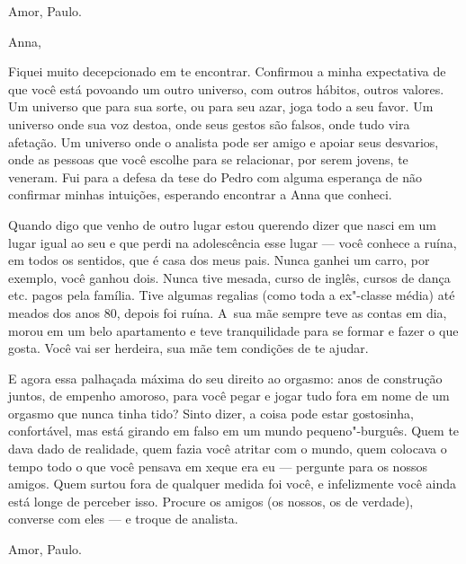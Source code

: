 \medskip{}  \begin{flushright}Amor, Paulo.\end{flushright}


\asterisc{}

Anna,

\medskip{} 

Fiquei muito decepcionado em te encontrar. Confirmou a minha expectativa
de que você está povoando um outro universo, com outros hábitos, outros
valores. Um universo que para sua sorte, ou para seu azar, joga todo a
seu favor. Um universo onde sua voz destoa, onde seus gestos são falsos,
onde tudo vira afetação. Um universo onde o analista pode ser amigo e
apoiar seus desvarios, onde as pessoas que você escolhe para se
relacionar, por serem jovens, te veneram. Fui para a defesa da tese do
Pedro com alguma esperança de não confirmar minhas intuições, esperando
encontrar a Anna que conheci.

Quando digo que venho de outro lugar estou querendo dizer que nasci em
um lugar igual ao seu e que perdi na adolescência esse lugar --- você
conhece a ruína, em todos os sentidos, que é casa dos meus pais. Nunca
ganhei um carro, por exemplo, você ganhou dois. Nunca tive mesada, curso
de inglês, cursos de dança etc. pagos pela família. Tive algumas
regalias (como toda a ex"-classe média) até meados dos anos 80, depois
foi ruína. A~sua mãe sempre teve as contas em dia, morou em um belo
apartamento e teve tranquilidade para se formar e fazer o que gosta.
Você vai ser herdeira, sua mãe tem condições de te ajudar.

E agora essa palhaçada máxima do seu direito ao orgasmo: anos de
construção juntos, de empenho amoroso, para você pegar e jogar tudo fora
em nome de um orgasmo que nunca tinha tido? Sinto dizer, a coisa pode
estar gostosinha, confortável, mas está girando em falso em um mundo
pequeno"-burguês. Quem te dava dado de realidade, quem fazia você atritar
com o mundo, quem colocava o tempo todo o que você pensava em xeque era
eu --- pergunte para os nossos amigos. Quem surtou fora de qualquer
medida foi você, e infelizmente você ainda está longe de perceber isso.
Procure os amigos (os nossos, os de verdade), converse com eles --- e
troque de analista.

\medskip{}  \begin{flushright}Amor, Paulo.\end{flushright}


\asterisc{}

\pagebreak{}

